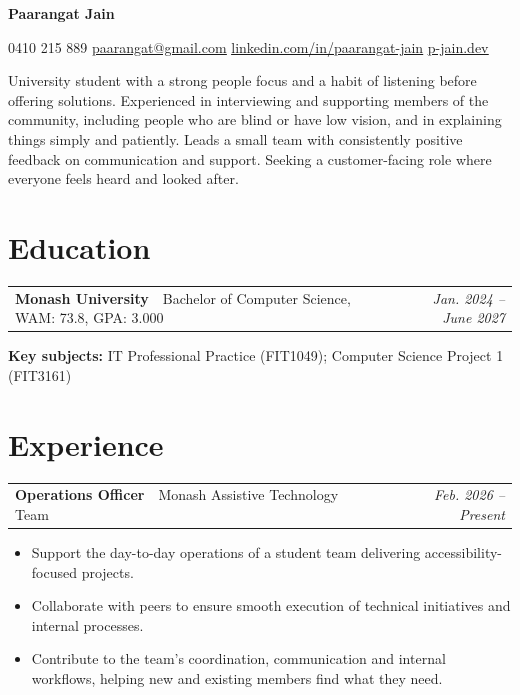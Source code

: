\documentclass[10pt,a4paper]{article}
\makeatletter
\let\oldhref\href
\renewcommand{\href}[2]{\oldhref{#1}{\underline{#2}}}
\newcommand{\resumeJob}[4]{%
  \par\addvspace{1pt}%
  \begin{tabularx}{\textwidth}{@{}Xr@{}}
    \textbf{#1}{\color{muted}\ \textbar{}\ #3} & \textit{#2}
  \end{tabularx}
  \vspace{-11pt}
}
\makeatother
\begin{document}
\fontsize{11.2}{13.4}\selectfont

{\centering
  {\LARGE\bfseries Paarangat Jain}\par
  \vspace{3pt}
  0410 215 889 \textbar{} \href{mailto:paarangat@gmail.com}{paarangat@gmail.com} \textbar{}
  \href{https://linkedin.com/in/paarangat-jain}{linkedin.com/in/paarangat-jain} \textbar{}
  \href{https://p-jain.dev}{p-jain.dev}\par
}

\vspace{6pt}
University student with a strong people focus and a habit of listening before offering solutions. Experienced in interviewing and supporting members of the community, including people who are blind or have low vision, and in explaining things simply and patiently. Leads a small team with consistently positive feedback on communication and support. Seeking a customer-facing role where everyone feels heard and looked after.

\section{Education}
\resumeJob{Monash University}{Jan. 2024 -- June 2027}{Bachelor of Computer Science, WAM: 73.8, GPA: 3.000}{}
\par\vspace{3pt}\noindent\textbf{Key subjects:} IT Professional Practice (FIT1049); Computer Science Project 1 (FIT3161)

\section{Experience}

\resumeJob{Operations Officer}{Feb. 2026 -- Present}{Monash Assistive Technology Team}{Clayton, VIC}
\begin{itemize}
  \item Support the day-to-day operations of a student team delivering accessibility-focused projects.
  \item Collaborate with peers to ensure smooth execution of technical initiatives and internal processes.
  \item Contribute to the team's coordination, communication and internal workflows, helping new and existing members find what they need.
\end{itemize}
\end{document}
